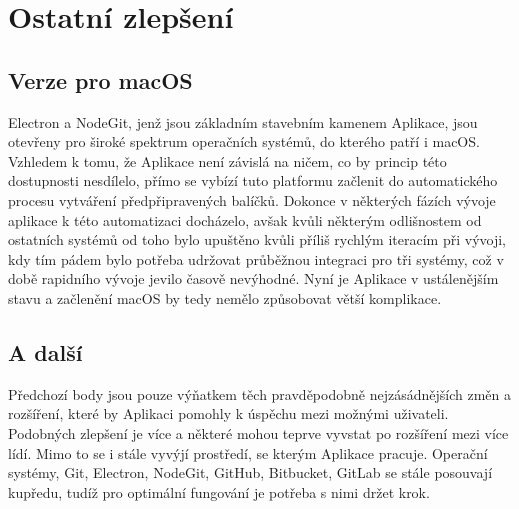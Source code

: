 \section{Ostatní zlepšení}

\subsection{Verze pro macOS}

Electron a NodeGit, jenž jsou základním stavebním kamenem Aplikace, jsou otevřeny pro široké spektrum operačních systémů, do kterého patří i macOS. Vzhledem k tomu, že Aplikace není závislá na ničem, co by princip této dostupnosti nesdílelo, přímo se vybízí tuto platformu začlenit do automatického procesu vytváření předpřipravených balíčků. Dokonce v některých fázích vývoje aplikace k této automatizaci docházelo, avšak kvůli některým odlišnostem od ostatních systémů od toho bylo upuštěno kvůli příliš rychlým iteracím při vývoji, kdy tím pádem bylo potřeba udržovat průběžnou integraci pro tři systémy, což v době rapidního vývoje jevilo časově nevýhodné. Nyní je Aplikace v ustálenějším stavu a začlenění macOS by tedy nemělo způsobovat větší komplikace.

\subsection{A další}

Předchozí body jsou pouze výňatkem těch pravděpodobně nejzásádnějších změn a rozšíření, které by Aplikaci pomohly k úspěchu mezi možnými uživateli. Podobných zlepšení je více a některé mohou teprve vyvstat po rozšíření mezi více lídí. Mimo to se i stále vyvýjí prostředí, se kterým Aplikace pracuje. Operační systémy, Git, Electron, NodeGit, GitHub, Bitbucket, GitLab se stále posouvají kupředu, tudíž pro optimální fungování je potřeba s nimi držet krok.